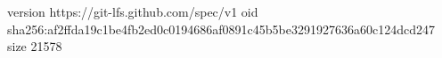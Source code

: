 version https://git-lfs.github.com/spec/v1
oid sha256:af2ffda19c1be4fb2ed0c0194686af0891c45b5be3291927636a60c124dcd247
size 21578
